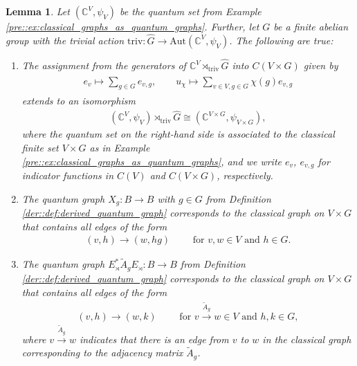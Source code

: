 \documentclass{amsart}
\newcommand{\C}{\mathbb{C}}
\newtheorem{lemma}[thm]{Lemma}
\theoremstyle{definition}
\theoremstyle{definition}
\begin{document}
\begin{lemma}
    \label{der::lemma:identification_of_derived_graph_components_classical_case}
    Let $(\C^V, \psi_V)$ be the quantum set from Example \ref{pre::ex:classical_graphs_as_quantum_graphs}. Further, let $G$ be a finite abelian group with the trivial action $\mathrm{triv}: \hat{G} \to \mathrm{Aut}(\C^V, \psi_V)$. The following are true:
    \begin{enumerate}
        \item The assignment from the generators of $\C^V \rtimes_{\mathrm{triv}} \hat{G}$ into $C(V \times G)$ given by
        \begin{align*}
            \begin{aligned}
                e_v \mapsto \sum_{g \in G} e_{v,g}, \qquad
                u_\chi \mapsto \sum_{v \in V, g \in G} \chi(g) e_{v,g}
            \end{aligned}
        \end{align*}
        extends to an isomorphism
        \begin{align*}
            (\C^V, \psi_V) \rtimes_{\mathrm{triv}} \hat{G} \cong (\C^{V \times G}, \psi_{V \times G}),
        \end{align*}
        where the quantum set on the right-hand side is associated to the classical finite set $V \times G$ as in Example \ref{pre::ex:classical_graphs_as_quantum_graphs}, and we write $e_v$, $e_{v, g}$ for indicator functions in $C(V)$ and $C(V \times G)$, respectively.
        \item The quantum graph $X_g: B \to B$ with $g \in G$ from Definition \ref{der::def:derived_quantum_graph} corresponds to the classical graph on $V \times G$ that contains all edges of the form
        \begin{align*}
            (v, h) \to (w, h g)
            \qquad
            \text{ for } v, w \in V \text{ and } h \in G.
        \end{align*}
        \item The quantum graph $E_\rtimes^\ast \tilde{A}_g E_\rtimes: B \to B$ from Definition \ref{der::def:derived_quantum_graph} corresponds to the classical graph on $V \times G$ that contains all edges of the form
        \begin{align*}
            (v, h) \to (w, k)
            \qquad
            \text{ for } v \overset{\tilde{A}_g}{\longrightarrow} w \in V \text{ and } h, k \in G,
        \end{align*}
        where $v \overset{\tilde{A}_g}{\longrightarrow} w$ indicates that there is an edge from $v$ to $w$ in the classical graph corresponding to the adjacency matrix $\tilde{A}_g$.

\end{enumerate}
\end{lemma}
\end{document}

